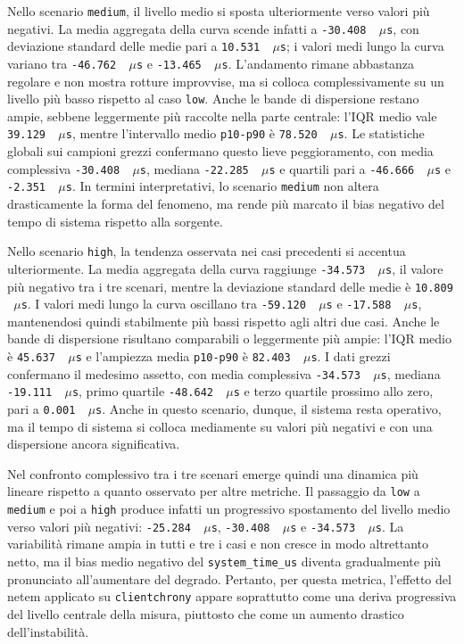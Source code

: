 Nello scenario \texttt{medium}, il livello medio si sposta ulteriormente verso valori
più negativi. La media aggregata della curva scende infatti a \texttt{-30.408 \,$\mu$s},
con deviazione standard delle medie pari a \texttt{10.531 \,$\mu$s}; i valori
medi lungo la curva variano tra \texttt{-46.762 \,$\mu$s} e \texttt{-13.465 \,$\mu$s}.
L'andamento rimane abbastanza regolare e non mostra rotture improvvise, ma si
colloca complessivamente su un livello più basso rispetto al caso \texttt{low}.
Anche le bande di dispersione restano ampie, sebbene leggermente più raccolte nella
parte centrale: l'IQR medio vale \texttt{39.129 \,$\mu$s}, mentre l'intervallo
medio \texttt{p10-p90} è \texttt{78.520 \,$\mu$s}. Le statistiche globali sui campioni
grezzi confermano questo lieve peggioramento, con media complessiva \texttt{-30.408
\,$\mu$s}, mediana \texttt{-22.285 \,$\mu$s} e quartili pari a \texttt{-46.666 \,$\mu$s}
e \texttt{-2.351 \,$\mu$s}. In termini interpretativi, lo scenario \texttt{medium}
non altera drasticamente la forma del fenomeno, ma rende più marcato il bias negativo
del tempo di sistema rispetto alla sorgente.

Nello scenario \texttt{high}, la tendenza osservata nei casi precedenti si accentua
ulteriormente. La media aggregata della curva raggiunge \texttt{-34.573 \,$\mu$s},
il valore più negativo tra i tre scenari, mentre la deviazione standard delle medie
è \texttt{10.809 \,$\mu$s}. I valori medi lungo la curva oscillano tra \texttt{-59.120
\,$\mu$s} e \texttt{-17.588 \,$\mu$s}, mantenendosi quindi stabilmente più bassi
rispetto agli altri due casi. Anche le bande di dispersione risultano comparabili
o leggermente più ampie: l'IQR medio è \texttt{45.637 \,$\mu$s} e l'ampiezza media
\texttt{p10-p90} è \texttt{82.403 \,$\mu$s}. I dati grezzi confermano il
medesimo assetto, con media complessiva \texttt{-34.573 \,$\mu$s}, mediana \texttt{-19.111
\,$\mu$s}, primo quartile \texttt{-48.642 \,$\mu$s} e terzo quartile prossimo
allo zero, pari a \texttt{0.001 \,$\mu$s}. Anche in questo scenario, dunque, il sistema
resta operativo, ma il tempo di sistema si colloca mediamente su valori più
negativi e con una dispersione ancora significativa.

Nel confronto complessivo tra i tre scenari emerge quindi una dinamica più
lineare rispetto a quanto osservato per altre metriche. Il passaggio da \texttt{low}
a \texttt{medium} e poi a \texttt{high} produce infatti un progressivo
spostamento del livello medio verso valori più negativi: \texttt{-25.284 \,$\mu$s},
\texttt{-30.408 \,$\mu$s} e \texttt{-34.573 \,$\mu$s}. La variabilità rimane
ampia in tutti e tre i casi e non cresce in modo altrettanto netto, ma il bias medio
negativo del \texttt{system\_time\_us} diventa gradualmente più pronunciato all'aumentare
del degrado. Pertanto, per questa metrica, l'effetto del netem applicato su \texttt{clientchrony}
appare soprattutto come una deriva progressiva del livello centrale della misura,
piuttosto che come un aumento drastico dell'instabilità.

